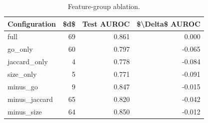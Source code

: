\begin{table}[htbp]
\centering
\caption{Feature-group ablation.}
\label{tab:ablation_recomputed}
\begin{tabular}{lrrr}
\toprule
Configuration & \$d\$ & Test AUROC & \$\textbackslash Delta\$ AUROC \\
\midrule
full & 69 & 0.861 & 0.000 \\
go\_only & 60 & 0.797 & -0.065 \\
jaccard\_only & 4 & 0.778 & -0.084 \\
size\_only & 5 & 0.771 & -0.091 \\
minus\_go & 9 & 0.847 & -0.015 \\
minus\_jaccard & 65 & 0.820 & -0.042 \\
minus\_size & 64 & 0.850 & -0.012 \\
\bottomrule
\end{tabular}

\end{table}
